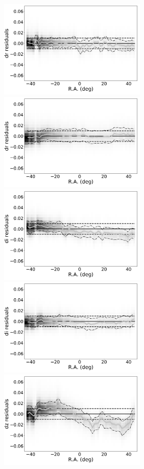 \documentclass[fleqn,usenatbib]{mnras}
\begin{document}
\begin{figure}
    \centering\includegraphics[width=7cm]{figures/colorResidDES42bright_dr_RA_Hess.png}
    \centering\includegraphics[width=7cm]{figures/colorResidPSDR2v42bright_dr_RA_Hess.png}
    \centering\includegraphics[width=7cm]{figures/colorResidDES42bright_di_RA_Hess.png}
    \centering\includegraphics[width=7cm]{figures/colorResidPSDR2v42bright_di_RA_Hess.png}
    \centering\includegraphics[width=7cm]{figures/colorResidDES42bright_dz_RA_Hess.png}

\end{figure}
\end{document}
